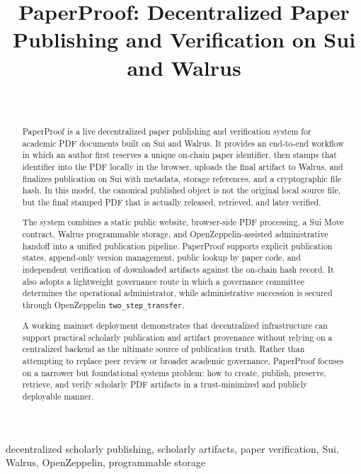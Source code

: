 \documentclass[journal]{IEEEtran}
\begin{document}
\title{PaperProof: Decentralized Paper Publishing and Verification on Sui and Walrus}

\author{\\
}
\IEEEaftertitletext{\vspace{-1\baselineskip}}
\maketitle

\begin{abstract}
PaperProof is a live decentralized paper publishing and verification system for academic PDF documents built on Sui and Walrus. It provides an end-to-end workflow in which an author first reserves a unique on-chain paper identifier, then stamps that identifier into the PDF locally in the browser, uploads the final artifact to Walrus, and finalizes publication on Sui with metadata, storage references, and a cryptographic file hash. In this model, the canonical published object is not the original local source file, but the final stamped PDF that is actually released, retrieved, and later verified.

The system combines a static public website, browser-side PDF processing, a Sui Move contract, Walrus programmable storage, and OpenZeppelin-assisted administrative handoff into a unified publication pipeline. PaperProof supports explicit publication states, append-only version management, public lookup by paper code, and independent verification of downloaded artifacts against the on-chain hash record. It also adopts a lightweight governance route in which a governance committee determines the operational administrator, while administrative succession is secured through OpenZeppelin \texttt{two\_step\_transfer}.

A working mainnet deployment demonstrates that decentralized infrastructure can support practical scholarly publication and artifact provenance without relying on a centralized backend as the ultimate source of publication truth. Rather than attempting to replace peer review or broader academic governance, PaperProof focuses on a narrower but foundational systems problem: how to create, publish, preserve, retrieve, and verify scholarly PDF artifacts in a trust-minimized and publicly deployable manner.
\end{abstract}

\begin{IEEEkeywords}
decentralized scholarly publishing, scholarly artifacts, paper verification, Sui, Walrus, OpenZeppelin, programmable storage
\end{IEEEkeywords}
\end{document}
